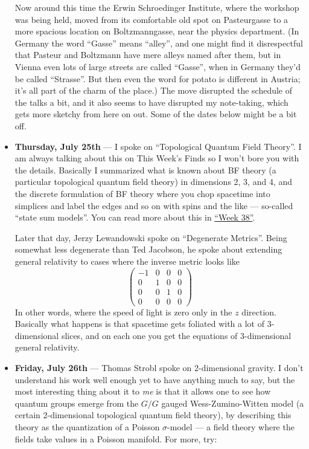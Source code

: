 \documentclass{article}
\begin{document}
\begin{itemize}
  Now around this time the Erwin Schroedinger Institute, where the
  workshop was being held, moved from its comfortable old spot on
  Pasteurgasse to a more spacious location on Boltzmanngasse, near the
  physics department. (In Germany the word ``Gasse'' means ``alley'',
  and one might find it disrespectful that Pasteur and Boltzmann have
  mere alleys named after them, but in Vienna even lots of large streets
  are called ``Gasse'', when in Germany they'd be called ``Strasse''.
  But then even the word for potato is different in Austria; it's all
  part of the charm of the place.) The move disrupted the schedule of
  the talks a bit, and it also seems to have disrupted my note-taking,
  which gets more sketchy from here on out. Some of the dates below
  might be a bit off.
\item
  \textbf{Thursday, July 25th} --- I spoke on ``Topological Quantum
  Field Theory''. I am always talking about this on This Week's Finds so
  I won't bore you with the details. Basically I summarized what is
  known about BF theory (a particular topological quantum field theory)
  in dimensions 2, 3, and 4, and the discrete formulation of BF theory
  where you chop spacetime into simplices and label the edges and so on
  with spins and the like --- so-called ``state sum models''. You can
  read more about this in \protect\hyperlink{week38}{``Week 38''}.

  Later that day, Jerzy Lewandowski spoke on ``Degenerate Metrics''.
  Being somewhat less degenerate than Ted Jacobson, he spoke about
  extending general relativity to cases where the inverse metric looks
  like \[
      \left(
        \begin{array}{cccc}
          -1&0&0&0
        \\0&1&0&0
        \\0&0&1&0
        \\0&0&0&0
        \end{array}
      \right)
    \] In other words, where the speed of light is zero only in the
  \(z\) direction. Basically what happens is that spacetime gets
  foliated with a lot of 3-dimensional slices, and on each one you get
  the equations of 3-dimensional general relativity.
\item
  \textbf{Friday, July 26th} --- Thomas Strobl spoke on 2-dimensional
  gravity. I don't understand his work well enough yet to have anything
  much to say, but the most interesting thing about it to \emph{me} is
  that it allows one to see how quantum groups emerge from the \(G/G\)
  gauged Wess-Zumino-Witten model (a certain 2-dimensional topological
  quantum field theory), by describing this theory as the quantization
  of a Poisson \(\sigma\)-model --- a field theory where the fields take
  values in a Poisson manifold. For more, try:


\end{itemize}
\end{document}
